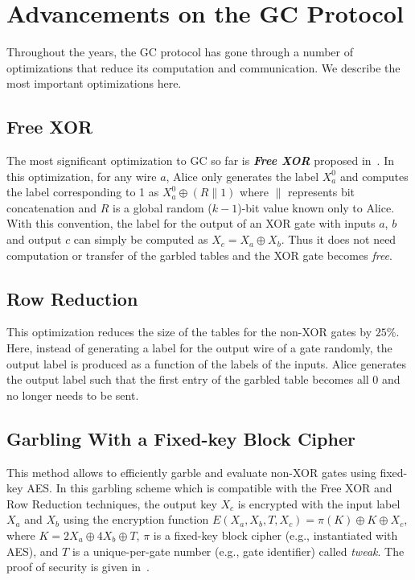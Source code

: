 \section{Advancements on the GC Protocol}
Throughout the years, the GC protocol has gone through a number of optimizations that reduce its computation and communication.
We describe the most important optimizations here.

\subsection{Free XOR~\cite{kolesnikov2008improved}}
The most significant optimization to GC so far is \textbf{\textit{Free XOR}} proposed in~\cite{kolesnikov2008improved}.
In this optimization, for any wire $a$, Alice only generates the label $X_a^{0}$ and computes the label corresponding to 1 as $X_a^{0}\oplus (R \parallel 1)$ where $\parallel$ represents bit concatenation and
$R$ is a global random ($k-1$)-bit value known only to Alice.
With this convention, the label for the output of an XOR gate with inputs $a$, $b$ and output $c$ can simply be computed as $X_{c} = X_{a} \oplus X_{b}$.
Thus it does not need computation or transfer of the garbled tables and the XOR gate becomes \textit{free}.

\subsection{Row Reduction~\cite{naor1999privacy}}
This optimization reduces the size of the tables for the non-XOR gates by $25\%$.
Here, instead of generating a label for the output wire of a gate randomly, the output label is produced as a function of the labels of the inputs.
Alice generates the output label such that the first entry of the garbled table becomes all $0$ and no longer needs to be sent.

\subsection{Garbling With a Fixed-key Block Cipher~\cite{bellare2013efficient}}
This method allows to efficiently garble and evaluate non-XOR gates using fixed-key AES.
In this garbling scheme which is compatible with the Free XOR and Row Reduction techniques, the output key $X_{c}$ is encrypted with the input label $X_{a}$ and $X_{b}$ using the encryption function $E(X_a,X_b,T,X_c) = \pi(K) \oplus K \oplus X_c$, where $K=2X_a\oplus4X_b\oplus T$, $\pi$ is a fixed-key block cipher (e.g., instantiated with AES), and $T$ is a unique-per-gate number (e.g., gate identifier) called \emph{tweak}.
The proof of security is given in~\cite{bellare2013efficient}.

